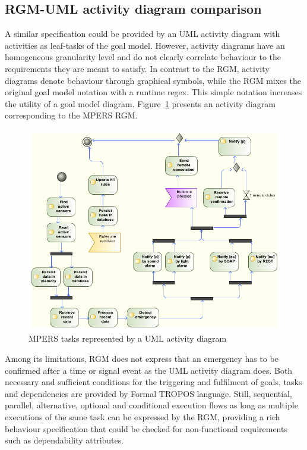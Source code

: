 \subsection{RGM-UML activity diagram comparison}

A similar specification could be provided by an UML activity diagram with activities as leaf-tasks of the goal model. However, activity diagrams have an homogeneous granularity level and do not clearly correlate behaviour to the requirements they are meant to satisfy. In contrast to the RGM, activity diagrams denote behaviour through graphical symbols, while the RGM mixes the original goal model notation with a runtime regex. This simple notation increases the utility of a goal model diagram. Figure~\ref{fig:MPERS_UMLAD} presents an activity diagram corresponding to the MPERS RGM. 

\begin{figure}[h!]
\centering
\includegraphics[width=1\textwidth]{imgs/MPERS_UMLAD.png}
\caption{MPERS tasks represented by a UML activity diagram}
\label{fig:MPERS_UMLAD}
\end{figure}

Among its limitations, RGM does not express that an emergency has to be confirmed after a time or signal event as the UML activity diagram does. Both necessary and sufficient conditions for the triggering and fulfilment of goals, tasks and dependencies are provided by Formal TROPOS language.  Still, sequential, parallel, alternative, optional and conditional execution flows as long as multiple executions of the same task can be expressed by the RGM, providing a rich behaviour specification that could be checked for non-functional requirements such as dependability attributes.

